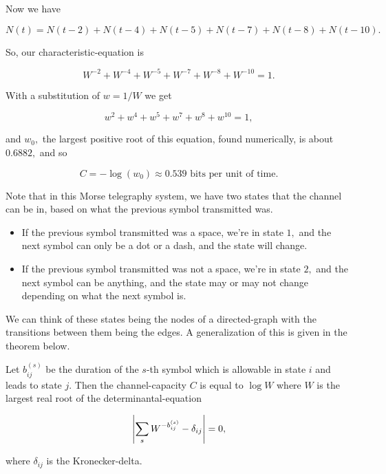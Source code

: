 \documentclass{article}
\begin{document}
\begin{example}
Now we have

\[ N(t) = N(t - 2) + N(t - 4) + N(t - 5) + N(t - 7) + N(t - 8) + N(t - 10). \]

So, our \@{characteristic-equation} is

\[ W^{-2} + W^{-4} + W^{-5} + W^{-7} + W^{-8} + W^{-10} = 1. \tag{a} \]

With a substitution of $w = 1/W$ we get

\[ w^{2} + w^{4} + w^{5} + w^{7} + w^{8} + w^{10} = 1, \]

and $w_0,$ the largest positive root of this equation, found numerically, is about $0.6882,$ and so

\[ C = -\log{(w_0)} \approx 0.539 \text{ bits per unit of time}. \]

Note that in this Morse telegraphy system, we have two states that the channel can be in, based on what the previous symbol transmitted was.

\begin{itemize}
\item If the previous symbol transmitted was a space, we're in state $1,$ and the next symbol can only be a dot or a dash, and the state will change.
\end{itemize}

\begin{itemize}
\item If the previous symbol transmitted was not a space, we're in state $2,$ and the next symbol can be anything, and the state may or may not change depending on what the next symbol is.
\end{itemize}

We can think of these states being the \@{nodes} of a \@{directed-graph} with the transitions between them being the \@{edges}. A generalization of this is given in the theorem below.
\end{example}

\begin{theorem}
Let $b_{ij}^{(s)}$ be the duration of the $s$-th symbol which is allowable in state $i$ and leads to state $j.$ Then the \@{channel-capacity} $C$ is equal to $\log{W}$ where $W$ is the largest real root of the \@{determinantal-equation}

\[ \left| \sum_{s} W^{-b_{ij}^{(s)}} - \delta_{ij} \right| = 0, \]

where $\delta_{ij}$ is the \@{Kronecker-delta}.
\end{theorem}

\detach
\end{document}
